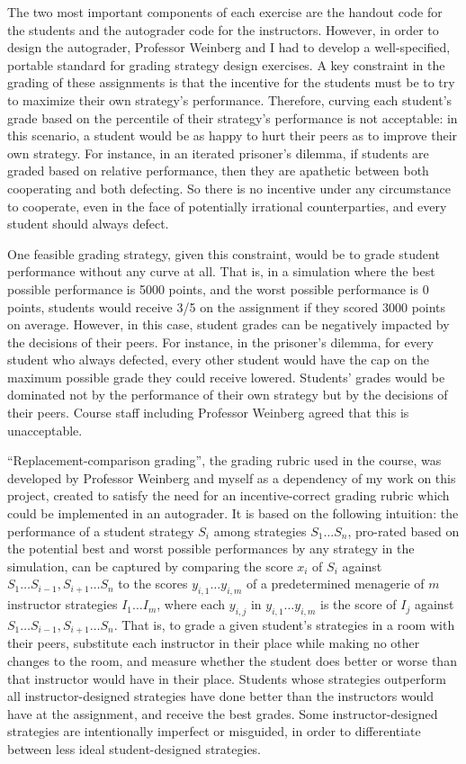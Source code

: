 \documentclass[pageno]{jpaper}
\begin{document}
The two most important components of each exercise are the handout code for the students and the autograder code for the instructors.
However, in order to design the autograder, Professor Weinberg and I had to develop a well-specified, portable standard for grading strategy design exercises.
A key constraint in the grading of these assignments is that the incentive for the students must be to try to maximize their own strategy's performance.
Therefore, curving each student's grade based on the percentile of their strategy's performance is not acceptable: in this scenario, a student would be as happy to hurt their peers as to improve their own strategy.
For instance, in an iterated prisoner's dilemma, if students are graded based on relative performance, then they are apathetic between both cooperating and both defecting.
So there is no incentive under any circumstance to cooperate, even in the face of potentially irrational counterparties, and every student should always defect.

One feasible grading strategy, given this constraint, would be to grade student performance without any curve at all.
That is, in a simulation where the best possible performance is 5000 points, and the worst possible performance is 0 points, students would receive 3/5 on the assignment if they scored 3000 points on average.
However, in this case, student grades can be negatively impacted by the decisions of their peers.
For instance, in the prisoner's dilemma, for every student who always defected, every other student would have the cap on the maximum possible grade they could receive lowered.
Students' grades would be dominated not by the performance of their own strategy but by the decisions of their peers.
Course staff including Professor Weinberg agreed that this is unacceptable.

``Replacement-comparison grading'', the grading rubric used in the course, was developed by Professor Weinberg and myself as a dependency of my work on this project, created to satisfy the need for an incentive-correct grading rubric which could be implemented in an autograder.
It is based on the following intuition: the performance of a student strategy $S_i$ among strategies $S_1 \ldots S_n$, pro-rated based on the potential best and worst possible performances by any strategy in the simulation, can be captured by comparing the score $x_i$ of $S_i$ against $S_1 \ldots S_{i-1}, S_{i+1} \ldots S_n$ to the scores $y_{i,1} \ldots y_{i,m}$ of a predetermined menagerie of $m$ instructor strategies $I_1 \ldots I_m$, where each $y_{i,j}$ in $y_{i,1} \ldots y_{i,m}$ is the score of $I_j$ against $S_1 \ldots S_{i-1}, S_{i+1} \ldots S_n$.
That is, to grade a given student's strategies in a room with their peers, substitute each instructor in their place while making no other changes to the room, and measure whether the student does better or worse than that instructor would have in their place.
Students whose strategies outperform all instructor-designed strategies have done better than the instructors would have at the assignment, and receive the best grades.
Some instructor-designed strategies are intentionally imperfect or misguided, in order to differentiate between less ideal student-designed strategies.
\end{document}
